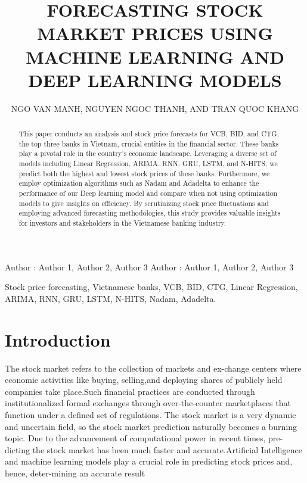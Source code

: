 \documentclass{ieeeojies}
\begin{document}
\title{FORECASTING STOCK MARKET PRICES USING MACHINE LEARNING AND DEEP LEARNING MODELS}

\author{\uppercase{Ngo van manh},
\uppercase{Nguyen ngoc thanh, and Tran Quoc khang}}

\address[1]{Faculty of Information Systems, University of Information Technology, (e-mail: 21522328@gm.uit.edu.vn)}
\address[2]{Faculty of Information Systems, University of Information Technology, (e-mail: 21522600@gm.uit.edu.vn)}
\address[3]{Faculty of Information Systems, University of Information Technology, (e-mail: 21522200@gm.uit.edu.vn)}

\markboth
{Author \headeretal: Author 1, Author 2, Author 3}
{Author \headeretal: Author 1, Author 2, Author 3}

\begin{abstract}
This paper conducts an analysis and stock price forecasts for VCB, BID, and CTG, the top three banks in Vietnam, crucial entities in the financial sector. These banks play a pivotal role in the country's economic landscape. Leveraging a diverse set of models including Linear Regression, ARIMA, RNN, GRU, LSTM, and N-HITS, we predict both the highest and lowest stock prices of these banks. Furthermore, we employ optimization algorithms such as Nadam and Adadelta to enhance the performance of our Deep learning model and compare when not using optimization models to give insights on efficiency. By scrutinizing stock price fluctuations and employing advanced forecasting methodologies, this study provides valuable insights for investors and stakeholders in the Vietnamese banking industry.
\end{abstract}

\begin{keywords}
Stock price forecasting, Vietnamese banks, VCB, BID, CTG, Linear Regression, ARIMA, RNN, GRU, LSTM, N-HITS, Nadam, Adadelta.
\end{keywords}

\titlepgskip=-15pt

\maketitle

\section{Introduction}
\label{sec:introduction}
The stock market refers to the collection of markets and ex-change centers where economic activities like buying, selling,and deploying shares of publicly held companies take place.Such financial practices are conducted through institutionalized formal exchanges through over‐the‐counter marketplaces that function under a defined set of regulations. The stock market is a very dynamic and uncertain field, so the stock market prediction naturally becomes a burning topic. Due to the advancement of computational power in recent times, pre-dicting the stock market has been much faster and accurate.Artificial Intelligence and machine learning models play a crucial role in predicting stock prices and, hence, deter-mining an accurate result \cite{b1} \\
\end{document}

